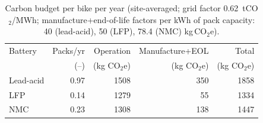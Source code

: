 \begin{table}[t]
\centering\small
\caption{Carbon budget per bike per year (site-averaged; grid factor 0.62~tCO$_2$/MWh; manufacture+end-of-life factors per kWh of pack capacity: 40 (lead-acid), 50 (LFP), 78.4 (NMC) kg\,CO$_2$e).}
\label{tab:co2bike}
\begin{tabular}{lrrrr}
\toprule
Battery & Packs/yr & Operation & Manufacture+EOL & Total \\
 & (--) & (kg CO$_2$e) & (kg CO$_2$e) & (kg CO$_2$e) \\
\midrule
Lead-acid & 0.97 & 1508 & 350 & 1858 \\
LFP & 0.14 & 1279 & 55 & 1334 \\
NMC & 0.23 & 1308 & 138 & 1447 \\
\bottomrule
\end{tabular}
\end{table}
